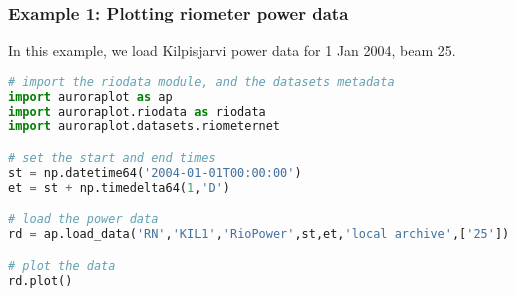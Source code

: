\documentclass{article}
\begin{document}
\subsubsection{Example 1: Plotting riometer power data}

In this example, we load Kilpisjarvi power data for 1 Jan 2004, beam 25.

\begin{lstlisting}[language=Python]
# import the riodata module, and the datasets metadata
import auroraplot as ap
import auroraplot.riodata as riodata
import auroraplot.datasets.riometernet

# set the start and end times
st = np.datetime64('2004-01-01T00:00:00')
et = st + np.timedelta64(1,'D')

# load the power data
rd = ap.load_data('RN','KIL1','RioPower',st,et,'local archive',['25'])

# plot the data
rd.plot()
\end{lstlisting}
\end{document}
